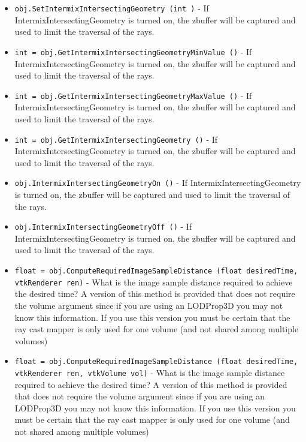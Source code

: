 \begin{itemize}
\item  \verb|obj.SetIntermixIntersectingGeometry (int )| -  If IntermixIntersectingGeometry is turned on, the zbuffer will be
 captured and used to limit the traversal of the rays.

\item  \verb|int = obj.GetIntermixIntersectingGeometryMinValue ()| -  If IntermixIntersectingGeometry is turned on, the zbuffer will be
 captured and used to limit the traversal of the rays.

\item  \verb|int = obj.GetIntermixIntersectingGeometryMaxValue ()| -  If IntermixIntersectingGeometry is turned on, the zbuffer will be
 captured and used to limit the traversal of the rays.

\item  \verb|int = obj.GetIntermixIntersectingGeometry ()| -  If IntermixIntersectingGeometry is turned on, the zbuffer will be
 captured and used to limit the traversal of the rays.

\item  \verb|obj.IntermixIntersectingGeometryOn ()| -  If IntermixIntersectingGeometry is turned on, the zbuffer will be
 captured and used to limit the traversal of the rays.

\item  \verb|obj.IntermixIntersectingGeometryOff ()| -  If IntermixIntersectingGeometry is turned on, the zbuffer will be
 captured and used to limit the traversal of the rays.

\item  \verb|float = obj.ComputeRequiredImageSampleDistance (float desiredTime, vtkRenderer ren)| -  What is the image sample distance required to achieve the desired time?
 A version of this method is provided that does not require the volume
 argument since if you are using an LODProp3D you may not know this information.
 If you use this version you must be certain that the ray cast mapper is
 only used for one volume (and not shared among multiple volumes)

\item  \verb|float = obj.ComputeRequiredImageSampleDistance (float desiredTime, vtkRenderer ren, vtkVolume vol)| -  What is the image sample distance required to achieve the desired time?
 A version of this method is provided that does not require the volume
 argument since if you are using an LODProp3D you may not know this information.
 If you use this version you must be certain that the ray cast mapper is
 only used for one volume (and not shared among multiple volumes)


\end{itemize}
